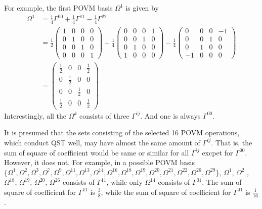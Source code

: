 For example, the first POVM basis $\Omega^{1}$ is given by
\begin{align*}
    \Omega^{1} &= \frac{1}{4} \Gamma^{00} + \frac{1}{4}\Gamma^{11} - \frac{1}{4} \Gamma^{22}  \\
    &= 
    \frac{1}{2}
    \begin{pmatrix}
        1&0&0&0\\
        0&1&0&0\\
        0&0&1&0\\
        0&0&0&1
    \end{pmatrix}
    +
    \frac{1}{4}
    \begin{pmatrix}
        0&0&0&1\\
        0&0&1&0\\
        0&1&0&0\\
        1&0&0&0
    \end{pmatrix}
    -
    \frac{1}{4}
    \begin{pmatrix}
        0&0&0&-1\\
        0&0&1&0\\
        0&1&0&0\\
        -1&0&0&0
    \end{pmatrix}
    \\
    &=
    \begin{pmatrix}
        \frac{1}{2} &0&0& \frac{1}{2} \\
        0&\frac{1}{2}&0&0 \\
        0&0&\frac{1}{2}&0 \\
        \frac{1}{2} &0&0& \frac{1}{2}
    \end{pmatrix}
\end{align*}
Interestingly, all the $\Omega^{k}$ consists of three $\Gamma^{ij}$. And one is always $\Gamma^{00}$.

It is presumed that the sets consisting of the selected 16 POVM operations, which conduct QST well, may have almost the same amount of $\Gamma^{ij}$. That is, the sum of square of coefficient would be same or similar for all $\Gamma^{ij}$ excpet for $\Gamma^{00}$.
However, it does not. For example, in a possible POVM basis $\{\Omega^1 , \Omega^2 , \Omega^3 , \Omega^7 , \Omega^9 ,\Omega^{11} ,\Omega^{13} ,\Omega^{14} ,\Omega^{16} ,\Omega^{18} ,\Omega^{19} ,\Omega^{20} ,\Omega^{21} ,\Omega^{22},\Omega^{26} ,\Omega^{29} \}$, $\Omega^{1}$, $\Omega^2$ ,$\Omega^{18}$, $\Omega^{19}$, $\Omega^{20}$, $\Omega^{26} $ consists of $\Gamma^{11}$, while only $\Omega^{14}$ consists of $\Gamma^{01}$.
The sum of square of coefficient for $\Gamma^{11}$ is $\frac{3}{8}$, while the sum of square of coefficient for $\Gamma^{01}$ is $\frac{1}{16}$.


